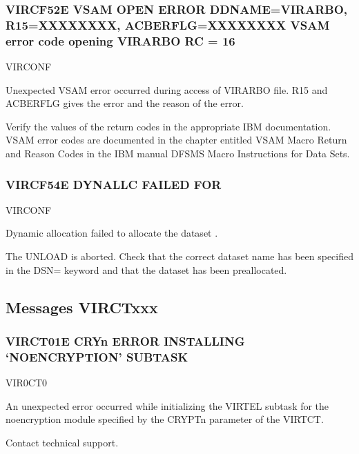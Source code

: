 \documentclass[letterpaper,10pt,english]{sphinxmanual}
\begin{document}
\subsubsection{VIRCF52E VSAM OPEN ERROR DDNAME=VIRARBO, R15=XXXXXXXX, ACBERFLG=XXXXXXXX VSAM error code opening VIRARBO \sphinxhyphen{} RC = 16}
\label{\detokenize{messages:vircf52e-vsam-open-error-ddname-virarbo-r15-xxxxxxxx-acberflg-xxxxxxxx-vsam-error-code-opening-virarbo-rc-16}}\begin{description}
\sphinxAtStartPar
VIRCONF

\sphinxAtStartPar
Unexpected VSAM error occurred during access of VIRARBO file. R15 and ACBERFLG gives the error and the reason of the error.

\sphinxAtStartPar
Verify the values of the return codes in the appropriate IBM documentation. VSAM error codes are documented in the chapter entitled VSAM Macro Return and Reason Codes in the IBM manual DFSMS Macro Instructions for Data Sets.

\end{description}


\subsubsection{VIRCF54E DYNALLC FAILED FOR }
\label{\detokenize{messages:vircf54e-dynallc-failed-for-dsname}}\begin{description}
\sphinxAtStartPar
VIRCONF

\sphinxAtStartPar
Dynamic allocation failed to allocate the dataset .

\sphinxAtStartPar
The UNLOAD is aborted. Check that the correct dataset name has been specified in the DSN= keyword and that the dataset has been preallocated.

\end{description}


\subsection{Messages VIRCTxxx}
\label{\detokenize{messages:messages-virctxxx}}

\subsubsection{VIRCT01E CRYn ERROR INSTALLING ‘NO\sphinxhyphen{}ENCRYPTION’ SUBTASK}
\label{\detokenize{messages:virct01e-cryn-error-installing-no-encryption-subtask}}\begin{description}
\sphinxAtStartPar
VIR0CT0

\sphinxAtStartPar
An unexpected error occurred while initializing the VIRTEL subtask for the no\sphinxhyphen{}encryption module specified by the CRYPTn parameter of the VIRTCT.

\sphinxAtStartPar
Contact technical support.

\end{description}
\end{document}
